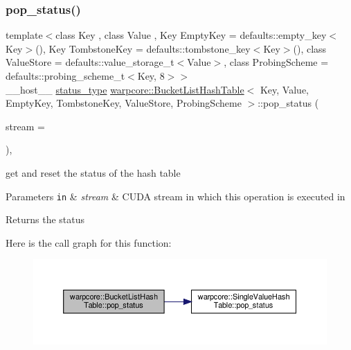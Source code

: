 \subsubsection{\texorpdfstring{pop\+\_\+status()}{pop\_status()}}
{\footnotesize\ttfamily template$<$class Key , class Value , Key Empty\+Key = defaults\+::empty\+\_\+key$<$\+Key$>$(), Key Tombstone\+Key = defaults\+::tombstone\+\_\+key$<$\+Key$>$(), class Value\+Store  = defaults\+::value\+\_\+storage\+\_\+t$<$\+Value$>$, class Probing\+Scheme  = defaults\+::probing\+\_\+scheme\+\_\+t$<$\+Key, 8$>$$>$ \\
\+\_\+\+\_\+host\+\_\+\+\_\+ \hyperlink{classwarpcore_1_1Status}{status\+\_\+type} \hyperlink{classwarpcore_1_1BucketListHashTable}{warpcore\+::\+Bucket\+List\+Hash\+Table}$<$ Key, Value, Empty\+Key, Tombstone\+Key, Value\+Store, Probing\+Scheme $>$\+::pop\+\_\+status (\begin{DoxyParamCaption}\item[{const cuda\+Stream\+\_\+t}]{stream = {} }\end{DoxyParamCaption})\hspace{0.3cm}{\ttfamily [inline]}, {\ttfamily [noexcept]}}



get and reset the status of the hash table 


\begin{DoxyParams}[1]{Parameters}
\mbox{\tt in}  & {\em stream} & C\+U\+DA stream in which this operation is executed in \\
\hline
\end{DoxyParams}
\begin{DoxyReturn}{Returns}
the status 
\end{DoxyReturn}
Here is the call graph for this function\+:
\nopagebreak
\begin{figure}[H]
\begin{center}
\leavevmode
\includegraphics[width=350pt]{classwarpcore_1_1BucketListHashTable_a4ffc8f2f167156c082efbd434be1d314_cgraph}
\end{center}
\end{figure}
\mbox{\label{classwarpcore_1_1BucketListHashTable_a7c5ccd6a8c7976db19951ea0ecd3aafc}} 
